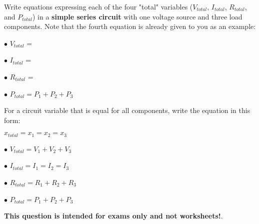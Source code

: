 

Write equations expressing each of the four "total" variables ($V_{total}$, $I_{total}$, $R_{total}$, and $P_{total}$) in a {\bf simple series circuit} with one voltage source and three load components.  Note that the fourth equation is already given to you as an example:

\vskip 10pt

\medskip
\item{$\bullet$} $V_{total}$ =
\vskip 5pt
\item{$\bullet$} $I_{total}$ =
\vskip 5pt
\item{$\bullet$} $R_{total}$ =
\vskip 5pt
\item{$\bullet$} $P_{total} = P_1 + P_2 + P_3$
\medskip

\vskip 10pt

For a circuit variable that is equal for all components, write the equation in this form: 

$x_{total} = x_1 = x_2 = x_3$







\medskip
\item{$\bullet$} $V_{total} = V_1 + V_2 + V_3$
\vskip 5pt
\item{$\bullet$} $I_{total} = I_1 = I_2 = I_3$
\vskip 5pt
\item{$\bullet$} $R_{total} = R_1 + R_2 + R_3$
\vskip 5pt
\item{$\bullet$} $P_{total} = P_1 + P_2 + P_3$
\medskip







{\bf This question is intended for exams only and not worksheets!}.



